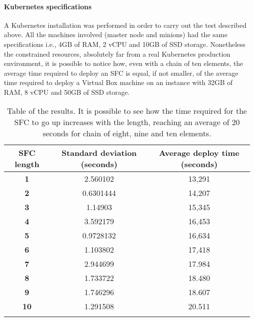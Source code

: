 \paragraph*{Kubernetes specifications}
A Kubernetes installation was performed in order to carry out the test
described above. All the machines involved (master node and minions) had the
same specifications i.e., 4GB of RAM, 2 vCPU and 10GB of SSD storage.
Nonetheless the constrained resources, absolutely far from a real Kubernetes
production environment, it is possible to notice how, even with a chain of ten
elements, the average time required to deploy an SFC is equal, if not smaller,
of the average time required to deploy a Virtual Box machine on an instance 
with 32GB of RAM, 8 vCPU and 50GB of SSD storage.

\begin{longtable}[c]{c|c|c}
\textbf{SFC length} & \textbf{Standard deviation (seconds)} & \textbf{Average 
deploy time (seconds)} \\ \hline
\endhead
%
\textbf{1}          & 2.560102                   & 13,291                     \\
\textbf{2}          & 0.6301444                  & 14,207                     \\
\textbf{3}          & 1.14903                    & 15,345                     \\
\textbf{4}          & 3.592179                   & 16,453                     \\
\textbf{5}          & 0.9728132                  & 16,634                     \\
\textbf{6}          & 1.103802                   & 17,418                     \\
\textbf{7}          & 2.944699                   & 17.984                     \\
\textbf{8}          & 1.733722                   & 18.480                     \\
\textbf{9}          & 1.746296                   & 18.607                     \\
\textbf{10}         & 1.291508                   & 20.511                     \\
\caption[SFC start up time]{Table of the results. It is possible to see how the
  time required for the SFC to go up increases with the length, reaching an
  average of 20 seconds for chain of eight, nine and ten elements.}
\label{chap:tests:sec:sfclength:tab:sfcdata}\\
\end{longtable}


